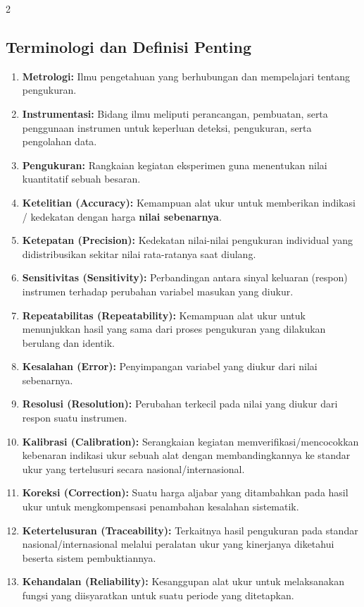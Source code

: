 \documentclass[10pt]{article}
\begin{document}
\begin{multicols}{2}
\subsection*{Terminologi dan Definisi Penting}
\begin{enumerate}
    \item \textbf{Metrologi:} Ilmu pengetahuan yang berhubungan dan mempelajari tentang pengukuran.
    \item \textbf{Instrumentasi:} Bidang ilmu meliputi perancangan, pembuatan, serta penggunaan instrumen untuk keperluan deteksi, pengukuran, serta pengolahan data.
    \item \textbf{Pengukuran:} Rangkaian kegiatan eksperimen guna menentukan nilai kuantitatif sebuah besaran.
    \item \textbf{Ketelitian (Accuracy):} Kemampuan alat ukur untuk memberikan indikasi / kedekatan dengan harga \textbf{nilai sebenarnya}.
    \item \textbf{Ketepatan (Precision):} Kedekatan nilai-nilai pengukuran individual yang didistribusikan sekitar nilai rata-ratanya saat diulang.
    \item \textbf{Sensitivitas (Sensitivity):} Perbandingan antara sinyal keluaran (respon) instrumen terhadap perubahan variabel masukan yang diukur.
    \item \textbf{Repeatabilitas (Repeatability):} Kemampuan alat ukur untuk menunjukkan hasil yang sama dari proses pengukuran yang dilakukan berulang dan identik.
    \item \textbf{Kesalahan (Error):} Penyimpangan variabel yang diukur dari nilai sebenarnya.
    \item \textbf{Resolusi (Resolution):} Perubahan terkecil pada nilai yang diukur dari respon suatu instrumen.
    \item \textbf{Kalibrasi (Calibration):} Serangkaian kegiatan memverifikasi/mencocokkan kebenaran indikasi ukur sebuah alat dengan membandingkannya ke standar ukur yang tertelusuri secara nasional/internasional.
    \item \textbf{Koreksi (Correction):} Suatu harga aljabar yang ditambahkan pada hasil ukur untuk mengkompensasi penambahan kesalahan sistematik.
    \item \textbf{Ketertelusuran (Traceability):} Terkaitnya hasil pengukuran pada standar nasional/internasional melalui peralatan ukur yang kinerjanya diketahui beserta sistem pembuktiannya.
    \item \textbf{Kehandalan (Reliability):} Kesanggupan alat ukur untuk melaksanakan fungsi yang diisyaratkan untuk suatu periode yang ditetapkan.

\end{enumerate}
\end{multicols}
\end{document}
